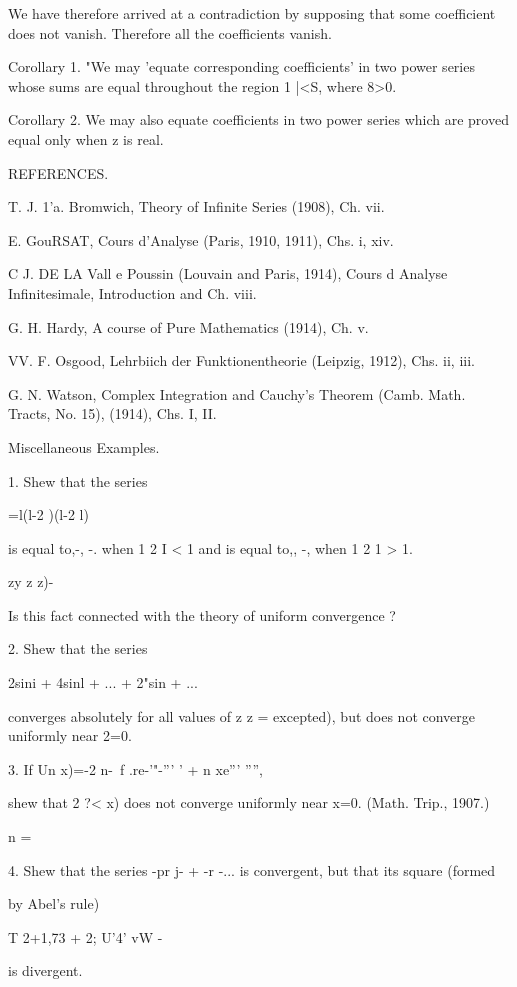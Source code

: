 %
%

We have therefore arrived at a contradiction by supposing that some
coefficient does not vanish. Therefore all the coefficients vanish.

Corollary 1. "We may 'equate corresponding coefficients' in two power
series whose sums are equal throughout the region 1 |<S, where 8>0.

Corollary 2. We may also equate coefficients in two power series which
are proved equal only when z is real.

REFERENCES.

T. J. 1'a. Bromwich, Theory of Infinite Series (1908), Ch. vii.

E. GouRSAT, Cours d'Analyse (Paris, 1910, 1911), Chs. i, xiv.

C J. DE LA Vall e Poussin (Louvain and Paris, 1914), Cours d Analyse
Infinitesimale, Introduction and Ch. viii.

G. H. Hardy, A course of Pure Mathematics (1914), Ch. v.

VV. F. Osgood, Lehrbiich der Funktionentheorie (Leipzig, 1912), Chs.
ii, iii.

G. N. Watson, Complex Integration and Cauchy's Theorem (Camb. Math.
Tracts, No. 15), (1914), Chs. I, II.

Miscellaneous Examples.

1. Shew that the series

 =l(l-2 )(l-2 l)

is equal to,-, -. when 1 2 I < 1 and is equal to,, -, when 1 2 1 >
1.

  zy z z)-

Is this fact connected with the theory of uniform convergence ?

2. Shew that the series

2sini + 4sinl + ... + 2"sin + ...

converges absolutely for all values of z z = excepted), but does not
converge uniformly near 2=0.

3. If Un x)=-2 n-\ f .re-'"-''' ' + n xe''' '''',

shew that 2 ?< x) does not converge uniformly near x=0. (Math. Trip.,
1907.)

n = \

4. Shew that the series -pr j- + -r -... is convergent, but that its
square (formed

by Abel's rule)

T 2+1,73 + 2; U'4' vW -

is divergent.

